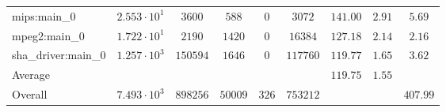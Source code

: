 \begin{tabular}{|l|c|c|c|c|c|c|c|c|}
mips:main\_0            & $ 2.553 \cdot 10^{1} $ & $ 3600   $ & $ 588   $ & $ 0   $ & $ 3072   $ & $ 141.00      $ & $ 2.91    $ & $ 5.69    $ \\
mpeg2:main\_0           & $ 1.722 \cdot 10^{1} $ & $ 2190   $ & $ 1420  $ & $ 0   $ & $ 16384  $ & $ 127.18      $ & $ 2.14    $ & $ 2.16    $ \\
sha\_driver:main\_0     & $ 1.257 \cdot 10^{3} $ & $ 150594 $ & $ 1646  $ & $ 0   $ & $ 117760 $ & $ 119.77      $ & $ 1.65    $ & $ 3.62    $ \\
\hline
Average                 & $                    $ & $        $ & $       $ & $     $ & $        $ & $ 119.75      $ & $ 1.55    $ & $         $ \\
\hline
Overall                 & $ 7.493 \cdot 10^{3} $ & $ 898256 $ & $ 50009 $ & $ 326 $ & $ 753212 $ & $             $ & $         $ & $ 407.99  $ \\
\hline
\end{tabular}
